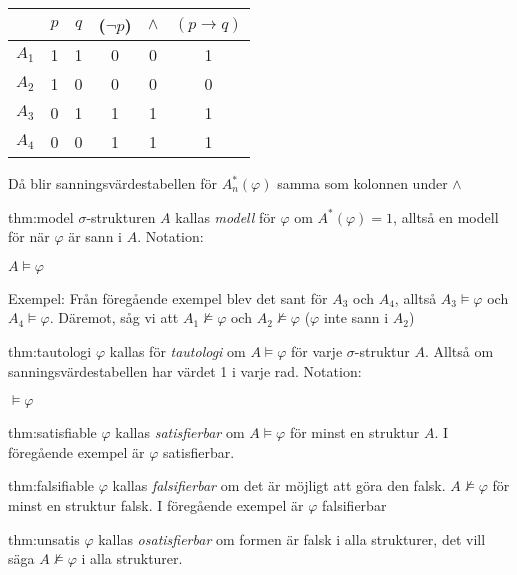 \begin{center}
  \begin{tabular}{|c|c|c|c|c|c|}
    \hline
    &$p$&$q$&($\neg p$)&$\wedge$&$(p\rightarrow q)$\\
    \hline
     $A_1$&1&1&0&0&1\\
    \hline
     $A_2$&1&0&0&0&0\\
    \hline
     $A_3$&0&1&1&1&1\\
    \hline
     $A_4$&0&0&1&1&1\\
    \hline
  \end{tabular}
\end{center}
\par\bigskip
\noindent Då blir sanningsvärdestabellen för $A_n^*(\varphi)$ samma som kolonnen under $\wedge$
\par\bigskip
\begin{theo}{thm:model}
  $\sigma$-strukturen $A$ kallas \textit{modell} för $\varphi$ om $A^*(\varphi)=1$, alltså en modell för när $\varphi$ är sann i $A$. Notation:
  \par\bigskip
  $A\vDash\varphi$
\end{theo}
\par\bigskip
\noindent Exempel: Från föregående exempel blev det sant för $A_3$ och $A_4$, alltså $A_3\vDash\varphi$ och $A_4\vDash\varphi$. Däremot, såg vi att $A_1\nvDash\varphi$ och $A_2\nvDash\varphi$ ($\varphi$ inte sann i $A_2$)
\par\bigskip
\begin{theo}[Tautologi]{thm:tautologi}
  $\varphi$ kallas för \textit{tautologi} om $A\vDash\varphi$ för varje $\sigma$-struktur $A$. Alltså om sanningsvärdestabellen har värdet 1 i varje rad. Notation:
  \par\bigskip
  $\vDash\varphi$
\end{theo}
\par\bigskip
\begin{theo}[Satisfierbar]{thm:satisfiable}
  $\varphi$ kallas \textit{satisfierbar} om $A\vDash\varphi$ för minst en struktur $A$. I föregående exempel är $\varphi$ satisfierbar.
\end{theo}
\par\bigskip
\begin{theo}[Falsifierbar]{thm:falsifiable}
  $\varphi$ kallas \textit{falsifierbar} om det är möjligt att göra den falsk. $A\nvDash\varphi$ för minst en struktur falsk. I föregående exempel är $\varphi$ falsifierbar
\end{theo}
\par\bigskip
\begin{theo}[Osatisfierbar]{thm:unsatis}
  $\varphi$ kallas \textit{osatisfierbar} om formen är falsk i alla strukturer, det vill säga $A\nvDash\varphi$ i alla strukturer.
\end{theo}











